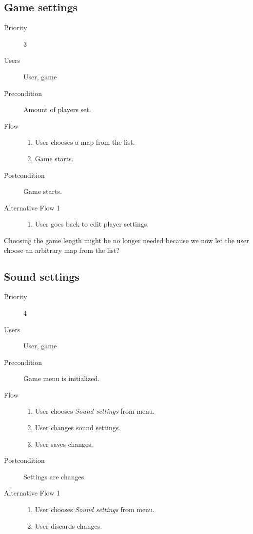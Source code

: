 \documentclass[12pt,a4paper]{article}
\begin{document}
\subsection{Game settings}
\begin{description}
\item[Priority] 3
\item[Users] User, game
\item[Precondition] Amount of players set.
\item[Flow]\mbox{}
  \begin{enumerate}
  \item User chooses a map from the list.
  \item Game starts.
  \end{enumerate}
\item[Postcondition] Game starts.
\item[Alternative Flow 1]\mbox{}
  \begin{enumerate}
  \item User goes back to edit player settings.
  \end{enumerate}
\end{description}

\begin{todo}
  Choosing the game length might be no longer needed because we now let
  the user choose an arbitrary map from the list?
\end{todo}

\subsection{Sound settings}
\begin{description}
\item[Priority] 4
\item[Users] User, game
\item[Precondition] Game menu is initialized.
\item[Flow]\mbox{}
  \begin{enumerate}
  \item User chooses \emph{Sound settings} from menu.
  \item User changes sound settings.
  \item User saves changes.
  \end{enumerate}
\item[Postcondition] Settings are changes. 
\item[Alternative Flow 1]\mbox{}
  \begin{enumerate}
  \item User chooses \emph{Sound settings} from menu.
  \item User discards changes.
  \end{enumerate}
\end{description}
\end{document}
